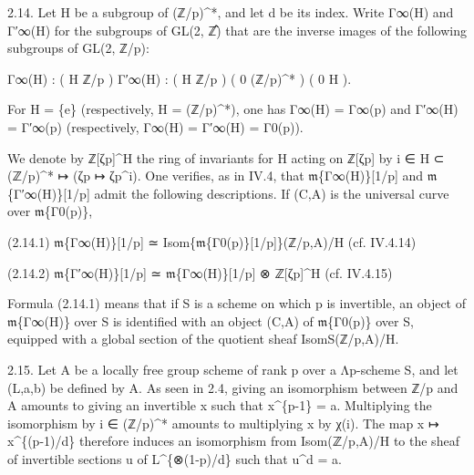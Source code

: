 \documentclass[11pt,a4paper]{article}
\begin{document}
2.14. Let H be a subgroup of (ℤ/p)\textasciicircum{}*, and let d be its index. Write Γ\textunderscore{}∞(H) and Γ′\textunderscore{}∞(H) for the subgroups of GL(2, ℤ̂) that are the inverse images of the following subgroups of GL(2, ℤ/p):

Γ\textunderscore{}∞(H) : ( H    ℤ/p )        Γ′\textunderscore{}∞(H) : ( H    ℤ/p ) ( 0   (ℤ/p)\textasciicircum{}* )                  ( 0      H  ).

For H = \{e\} (respectively, H = (ℤ/p)\textasciicircum{}*), one has Γ\textunderscore{}∞(H) = Γ\textunderscore{}∞(p) and Γ′\textunderscore{}∞(H) = Γ′\textunderscore{}∞(p) (respectively, Γ\textunderscore{}∞(H) = Γ′\textunderscore{}∞(H) = Γ\textunderscore{}0(p)).

We denote by ℤ[ζ\textunderscore{}p]\textasciicircum{}H the ring of invariants for H acting on ℤ[ζ\textunderscore{}p] by i ∈ H ⊂ (ℤ/p)\textasciicircum{}* ↦ (ζ\textunderscore{}p ↦ ζ\textunderscore{}p\textasciicircum{}i). One verifies, as in IV.4, that \ensuremath{\mathfrak{m}}\textunderscore{}\{Γ\textunderscore{}∞(H)\}[1/p] and \ensuremath{\mathfrak{m}}\textunderscore{}\{Γ′\textunderscore{}∞(H)\}[1/p] admit the following descriptions. If (C,A) is the universal curve over \ensuremath{\mathfrak{m}}\textunderscore{}\{Γ\textunderscore{}0(p)\},

(2.14.1)        \ensuremath{\mathfrak{m}}\textunderscore{}\{Γ\textunderscore{}∞(H)\}[1/p] ≃ Isom\textunderscore{}\{\ensuremath{\mathfrak{m}}\textunderscore{}\{Γ\textunderscore{}0(p)\}[1/p]\}(ℤ/p,A)/H        (cf. IV.4.14)

(2.14.2)        \ensuremath{\mathfrak{m}}\textunderscore{}\{Γ′\textunderscore{}∞(H)\}[1/p] ≃ \ensuremath{\mathfrak{m}}\textunderscore{}\{Γ\textunderscore{}∞(H)\}[1/p] ⊗ ℤ[ζ\textunderscore{}p]\textasciicircum{}H        (cf. IV.4.15)

Formula (2.14.1) means that if S is a scheme on which p is invertible, an object of \ensuremath{\mathfrak{m}}\textunderscore{}\{Γ\textunderscore{}∞(H)\} over S is identified with an object (C,A) of \ensuremath{\mathfrak{m}}\textunderscore{}\{Γ\textunderscore{}0(p)\} over S, equipped with a global section of the quotient sheaf Isom\textunderscore{}S(ℤ/p,A)/H.

2.15. Let A be a locally free group scheme of rank p over a Λ\textunderscore{}p-scheme S, and let (L,a,b) be defined by A. As seen in 2.4, giving an isomorphism between ℤ/p and A amounts to giving an invertible x such that x\textasciicircum{}\{p-1\} = a. Multiplying the isomorphism by i ∈ (ℤ/p)\textasciicircum{}* amounts to multiplying x by χ(i). The map x ↦ x\textasciicircum{}\{(p-1)/d\} therefore induces an isomorphism from Isom(ℤ/p,A)/H to the sheaf of invertible sections u of L\textasciicircum{}\{⊗(1-p)/d\} such that u\textasciicircum{}d = a.
\end{document}
